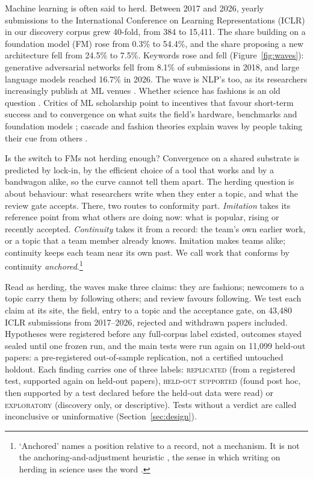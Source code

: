 \documentclass[11pt]{article}
\newcommand{\lab}[1]{\textsc{#1}}
\begin{document}
Machine learning is often said to herd. Between 2017 and 2026, yearly submissions to the International Conference
on Learning Representations (ICLR) in our discovery corpus grew 40-fold, from 384 to 15,411. The share building on a
foundation model (FM) rose from 0.3\% to 54.4\%, and the share proposing a new architecture fell from 24.5\% to
7.5\%. Keywords rose and fell (Figure~\ref{fig:waves}): generative adversarial networks fell from 8.1\% of
submissions in 2018, and large language models reached 16.7\% in 2026. The wave is NLP's too, as its researchers
increasingly publish at ML venues \citep{jurgens2026future}. Whether science has fashions is an old question
\citep{crane1969fashion}. Critics of ML scholarship point to incentives that favour short-term success
\citep{lipton2019troubling} and to convergence on what suits the field's hardware, benchmarks and foundation models
\citep{hooker2021hardware,dehghani2021benchmark,bommasani2021opportunities}; cascade and fashion theories explain
waves by people taking their cue from others
\citep{bikhchandani1992theory,banerjee1992simple,abrahamson1991managerial}.

Is the switch to FMs not herding enough? Convergence on a shared substrate is
predicted by lock-in, by the efficient choice of a tool that works and by a bandwagon alike, so the curve cannot tell
them apart. The herding question is about behaviour: what researchers write when they enter a topic, and what the
review gate accepts. There, two routes to conformity part. \emph{Imitation} takes its reference point from what
others are doing now: what is popular, rising or recently accepted. \emph{Continuity} takes it from a record: the
team's own earlier work, or a topic that a team member already knows. Imitation makes teams alike; continuity keeps
each team near its own past. We call work that conforms by continuity \emph{anchored}.\footnote{`Anchored' names a position relative to a record, not a mechanism.
It is not the anchoring-and-adjustment heuristic \citep{tversky1974judgment}, the sense in which writing on herding
in science uses the word \citep{baddeley2015herding}.}

Read as herding, the waves make three claims: they are fashions; newcomers to a topic carry them by following
others; and review favours following. We test each claim at its site, the field, entry to a topic and the
acceptance gate, on 43,480 ICLR submissions from 2017--2026, rejected and withdrawn papers included. Hypotheses
were registered before any full-corpus label existed, outcomes stayed sealed until one frozen run, and the main tests were run again on 11,099 held-out papers: a pre-registered out-of-sample replication, not a
certified untouched holdout. Each finding carries one of three labels: \lab{replicated} (from a registered test,
supported again on held-out papers), \lab{held-out supported} (found post hoc, then supported by a
test declared before the held-out data were read) or \lab{exploratory} (discovery only, or descriptive). Tests
without a verdict are called inconclusive or uninformative (Section~\ref{sec:design}).
\end{document}
